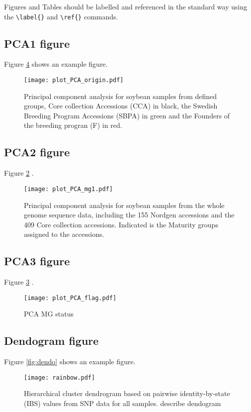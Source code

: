 \documentclass[9pt, onecolumn,twoside]{gsajnl}
\begin{document}
Figures and Tables should be labelled and referenced in the standard way using the \verb|\label{}| and \verb|\ref{}| commands.

\subsection{PCA1 figure}

Figure \ref{fig:pca} shows an example figure.

\begin{figure}[t]
\centering
\texttt{[image: plot\_PCA\_origin.pdf]}
\caption{Principal component analysis for soybean samples from defined groups, Core collection Accessions (CCA) in black, the Swedish Breeding Program Accessions (SBPA) in green and the Founders of the breeding progran (F) in red.}%
\label{fig:pca}
\end{figure}
\subsection{PCA2 figure}


Figure \ref{fig:pca2} .

\begin{figure}[t]
\centering
\texttt{[image: plot\_PCA\_mg1.pdf]}
\caption{Principal component analysis for soybean samples from the whole genome sequence data, including the 155 Nordgen accessions and the 409 Core collection accessions. Indicated is the Maturity groups assigned to the accessions.}
\label{fig:pca2}
\end{figure}


\subsection{PCA3 figure}


Figure \ref{fig:pca3} .

\begin{figure}[t]
\centering
\texttt{[image: plot\_PCA\_flag.pdf]}
\caption{PCA MG status}%
\label{fig:pca3}
\end{figure}
\subsection{Dendogram figure}

Figure \ref{fig:dendo} shows an example figure.

\begin{figure}[t]
\centering
\texttt{[image: rainbow.pdf]}
\caption{Hierarchical cluster dendrogram based on pairwise identity-by-state (IBS) values from SNP data for all samples. describe dendogram}%
\label{fig:pca}
\end{figure}
\end{document}
